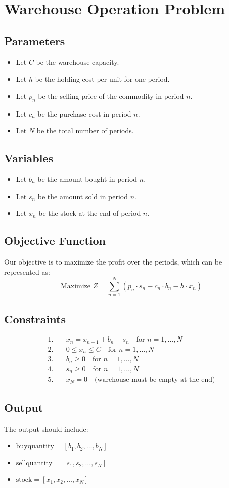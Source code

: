 \documentclass{article}
\begin{document}
\section*{Warehouse Operation Problem}

\subsection*{Parameters}
\begin{itemize}
    \item Let \( C \) be the warehouse capacity.
    \item Let \( h \) be the holding cost per unit for one period.
    \item Let \( p_n \) be the selling price of the commodity in period \( n \).
    \item Let \( c_n \) be the purchase cost in period \( n \).
    \item Let \( N \) be the total number of periods.
\end{itemize}

\subsection*{Variables}
\begin{itemize}
    \item Let \( b_n \) be the amount bought in period \( n \).
    \item Let \( s_n \) be the amount sold in period \( n \).
    \item Let \( x_n \) be the stock at the end of period \( n \).
\end{itemize}

\subsection*{Objective Function}
Our objective is to maximize the profit over the periods, which can be represented as:
\[
\text{Maximize } Z = \sum_{n=1}^{N} (p_n \cdot s_n - c_n \cdot b_n - h \cdot x_n)
\]

\subsection*{Constraints}
\begin{align*}
1. & \quad x_n = x_{n-1} + b_n - s_n \quad \text{for } n = 1, \ldots, N \\
2. & \quad 0 \leq x_n \leq C \quad \text{for } n = 1, \ldots, N \\
3. & \quad b_n \geq 0 \quad \text{for } n = 1, \ldots, N \\
4. & \quad s_n \geq 0 \quad \text{for } n = 1, \ldots, N \\
5. & \quad x_N = 0 \quad \text{(warehouse must be empty at the end)}
\end{align*}

\subsection*{Output}
The output should include:
\begin{itemize}
    \item \( \text{buyquantity} = [b_1, b_2, \ldots, b_N] \)
    \item \( \text{sellquantity} = [s_1, s_2, \ldots, s_N] \)
    \item \( \text{stock} = [x_1, x_2, \ldots, x_N] \)
\end{itemize}
\end{document}
